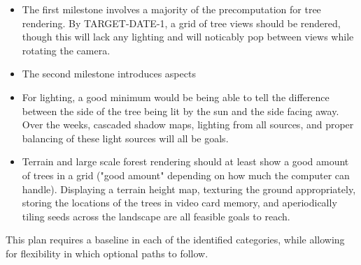 \documentclass{article}
\begin{document}
\begin {itemize}
\item The first milestone involves a majority of the precomputation for tree rendering. By TARGET-DATE-1, a grid of tree views should be rendered, though this will lack any lighting and will noticably pop between views while rotating the camera.

\item The second milestone introduces aspects 

\item For lighting, a good minimum would be being able to tell the difference between the side of the tree being lit by the sun and the side facing away. Over the weeks, cascaded shadow maps, lighting from all sources, and proper balancing of these light sources will all be goals.

\item Terrain and large scale forest rendering should at least show a good amount of trees in a grid ("good amount" depending on how much the computer can handle). Displaying a terrain height map, texturing the ground appropriately, storing the locations of the trees in video card memory, and aperiodically tiling seeds across the landscape are all feasible goals to reach.

\end {itemize}

This plan requires a baseline in each of the identified categories, while allowing for flexibility in which optional paths to follow.
\end{document}
